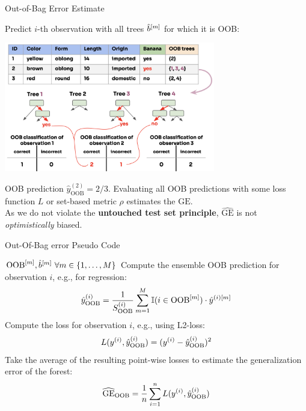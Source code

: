 \documentclass[11pt,compress,t,notes=noshow,xcolor=table]{beamer}
\begin{document}
\begin{vbframe}{Out-of-Bag Error Estimate}

Predict $i$-th observation with all trees $\hat{b}^{[m]}$ for which it is OOB:

\begin{center}
\includegraphics[width=0.69\textwidth]{figure_man/forest-oob-error.png}
\end{center}

OOB prediction $\hat{y}^{(2)}_{\text{OOB}} = 2/3$. %
Evaluating all OOB predictions with some loss function $L$ or set-based metric $\rho$ estimates the $\mathrm{GE}$.\\
As we do not violate the \textbf{untouched test set principle}, $\widehat{\mathrm{GE}}$ is not \textit{optimistically} biased.%
\end{vbframe}

\begin{vbframe}{Out-Of-Bag error Pseudo Code}
\begin{algorithm}[H]
  \footnotesize
  \caption*{Out-Of-Bag error estimation (loss-based)}
  \begin{algorithmic}[1]
     $\text{OOB}^{[m]}, \hat{b}^{[m]} \ \forall m \in \{1, \dots, M\}$
      \State Compute the ensemble OOB prediction for observation $i$, e.g., for regression:
      $$\hat{y}^{(i)}_{\text{OOB}} =
      \frac{1}{S_{\text{OOB}}^{(i)}} \sum_{m = 1}^{M} 
      \mathbb{I}(i \in \text{OOB}^{[m]}) \cdot \hat{y}^{(i)[m]} $$
      \State Compute the loss for observation $i$, e.g., using L2-loss:
      $$ L(y^{(i)}, \hat{y}^{(i)}_{\text{OOB}}) = (y^{(i)} - \hat{y}^{(i)}_{\text{OOB}})^2$$
    \EndFor
    \State Take the average of the resulting point-wise losses to estimate the generalization error of the forest: $$\widehat{\mathrm{GE}}_{\text{OOB}} = \frac{1}{n} \sum\limits_{i=1}^n L(y^{(i)}, \hat{y}^{(i)}_{\text{OOB}})$$
  
  \end{algorithmic}
\end{algorithm}
\end{vbframe}
\end{document}
